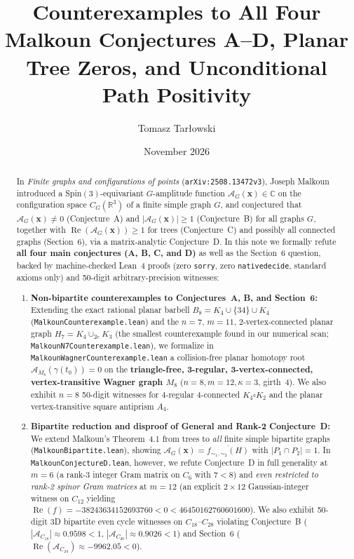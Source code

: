\documentclass[11pt]{amsart}
\title[Refutation of All Four Malkoun Conjectures A--D and Path Positivity]{Counterexamples to All Four Malkoun Conjectures A--D, Planar Tree Zeros, and Unconditional Path Positivity}
\author{Tomasz Tar{\l}owski}
\date{November 2026}
\renewcommand{\_}{\origunderscore\penalty0\relax}
\theoremstyle{plain}
\theoremstyle{definition}
\theoremstyle{remark}
\newcommand{\C}{\mathbb{C}}
\newcommand{\R}{\mathbb{R}}
\newcommand{\AG}{\mathcal{A}_G}
\DeclareMathOperator{\RePart}{Re}
\begin{document}
\begin{abstract}
In \emph{Finite graphs and configurations of points} (\texttt{arXiv:2508.13472v3}), Joseph Malkoun introduced a Spin$(3)$-equivariant $G$-amplitude function $\AG(\mathbf{x}) \in \C$ on the configuration space $C_G(\R^3)$ of a finite simple graph $G$, and conjectured that $\AG(\mathbf{x}) \neq 0$ (Conjecture~A) and $|\AG(\mathbf{x})| \ge 1$ (Conjecture~B) for all graphs $G$, together with $\RePart(\AG(\mathbf{x})) \ge 1$ for trees (Conjecture~C) and possibly all connected graphs (Section~6), via a matrix-analytic Conjecture~D. In this note we formally refute \textbf{all four main conjectures (A, B, C, and D)} as well as the Section~6 question, backed by machine-checked Lean~4 proofs (zero \texttt{sorry}, zero \texttt{native\_decide}, standard axioms only) and 50-digit arbitrary-precision witnesses:
\begin{enumerate}
    \item \textbf{Non-bipartite counterexamples to Conjectures~A, B, and Section~6:} Extending the exact rational planar barbell $B_8 = K_4 \cup \{34\} \cup K_4$ (\texttt{MalkounCounterexample.lean}) and the $n=7$, $m=11$, 2-vertex-connected planar graph $H_7 = K_4 \cup_{2e} K_3$ (the smallest counterexample found in our numerical scan; \texttt{MalkounN7Counterexample.lean}), we formalize in \texttt{MalkounWagnerCounterexample.lean} a collision-free planar homotopy root $\mathcal{A}_{M_8}(\gamma(t_0)) = 0$ on the \textbf{triangle-free, 3-regular, 3-vertex-connected, vertex-transitive Wagner graph $M_8$} ($n=8, m=12, \kappa=3$, girth~4). We also exhibit $n=8$ 50-digit witnesses for 4-regular 4-connected $K_4 \square K_2$ and the planar vertex-transitive square antiprism $A_4$.
    \item \textbf{Bipartite reduction and disproof of General and Rank-2 Conjecture~D:} We extend Malkoun's Theorem~4.1 from trees to \emph{all} finite simple bipartite graphs (\texttt{MalkounBipartite.lean}), showing $\AG(\mathbf{x}) = \overline{f_{\sim_1,\sim_2}(H)}$ with $|P_1 \cap P_2| = 1$. In \texttt{MalkounConjectureD.lean}, however, we refute Conjecture~D in full generality at $m=6$ (a rank-3 integer Gram matrix on $C_6$ with $7 < 8$) and \emph{even restricted to rank-2 spinor Gram matrices} at $m=12$ (an explicit $2 \times 12$ Gaussian-integer witness on $C_{12}$ yielding $\RePart(f) = -38243634152693760 < 0 < 46450162760601600$). We also exhibit 50-digit 3D bipartite even cycle witnesses on $C_{18}$--$C_{28}$ violating Conjecture~B ($|\mathcal{A}_{C_{18}}| \approx 0.9598 < 1$, $|\mathcal{A}_{C_{20}}| \approx 0.9026 < 1$) and Section~6 ($\RePart(\mathcal{A}_{C_{24}}) \approx -9962.05 < 0$).

\end{enumerate}
\end{abstract}
\end{document}
